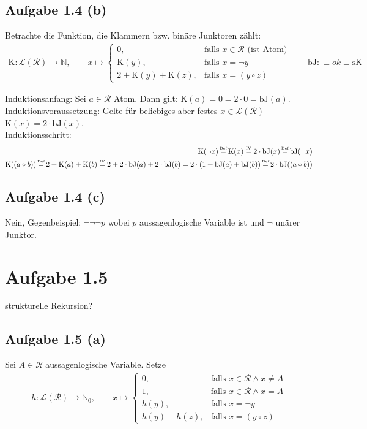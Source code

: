 \documentclass[12pt,a4paper]{article} %
\newcommand{\N}{\mathbb{N}}
\newcommand{\falls}{\text{falls }}
\newcommand{\myeq}[1]{\mathrel{\stackrel{\makebox[0pt]{\mbox{\normalfont\tiny #1}}}{=}}}
\newcommand{\sk}{\text{sK}}
\renewcommand{\k}{\text{K}}
\newcommand{\bj}{\text{bJ}}
\begin{document}
\subsection*{Aufgabe 1.4 (b)}
Betrachte die Funktion, die Klammern bzw. binäre Junktoren zählt:
\begin{align*}
\k:\mathcal{L}(\mathcal{R})\to\N,\qquad
x\mapsto\left\lbrace\begin{array}{cl}
0, & \falls x\in\mathcal{R}\text{ (ist Atom)}\\
\k(y), & \falls x=\neg y\\
2+\k(y)+\k(z), & \falls x=(y\circ z)
\end{array}\right.\qquad \bj:\equiv ok\equiv\sk
\end{align*}

Induktionsanfang: Sei $a\in\mathcal{R}$ Atom. Dann gilt: $\k(a)=0=2\cdot 0=\bj(a)$.\\
Induktionsvoraussetzung: Gelte für beliebiges aber festes $x\in\mathcal{L}(\mathcal{R})$ $\k(x)=2\cdot\bj(x)$.\\ 
Induktionsschritt:
\begin{align*}
\k(\neg x)\myeq{Def}\k(x)\myeq{IV}2\cdot\bj(x)\myeq{Def}\bj(\neg x)\\
\k((a\circ b))\myeq{Def}2+\k(a)+\k(b)\myeq{IV}2+2\cdot\bj(a)+2\cdot\bj(b)=2\cdot(1+\bj(a)+\bj(b))\myeq{Def}2\cdot\bj((a\circ b))
\end{align*}

\subsection*{Aufgabe 1.4 (c)}
Nein, Gegenbeispiel: $\neg\neg\neg p$ wobei  $p$ aussagenlogische Variable ist und $\neg$ unärer Junktor.

\section*{Aufgabe 1.5}
strukturelle Rekursion?
\subsection*{Aufgabe 1.5 (a)}
Sei $A\in\mathcal{R}$ aussagenlogische Variable. Setze
\begin{align*}
h:\mathcal{L}(\mathcal{R})\to\N_0,\qquad x\mapsto \left\lbrace\begin{array}{cl}
0, & \falls x\in\mathcal{R}\wedge x\neq A\\
1, & \falls x\in\mathcal{R}\wedge x=A\\
h(y), & \falls x=\neg y\\
h(y)+h(z), & \falls x=(y\circ z)
\end{array}\right.
\end{align*}
\end{document}
